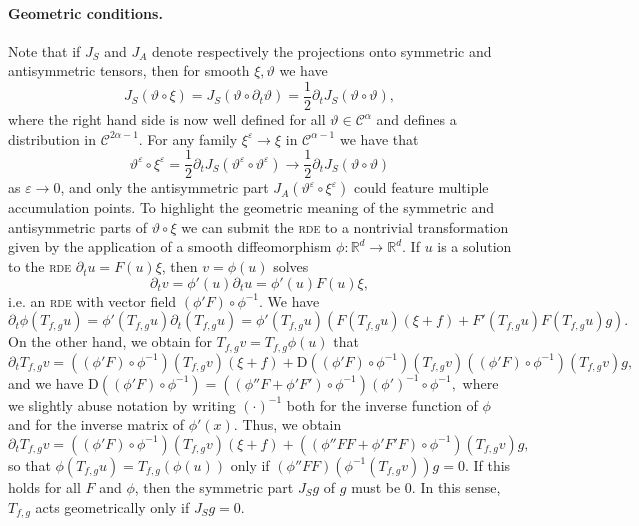 \documentclass[11pt,a4paper]{article}
\newcommand{\cdummy}{\cdot}
\newcommand{\mathD}{\mathrm{D}}
\theoremstyle{remark}
\newcommand{\CC}{\ensuremath{\mathscr{C}}}
\begin{document}
\paragraph{Geometric conditions.}
Note that if $J_{S}$ and $J_{A}$ denote respectively the projections onto
symmetric and antisymmetric tensors, then for smooth $\xi , \vartheta$ we have
\[
   J_{S} ( \vartheta \circ \xi ) = J_{S} ( \vartheta \circ \partial_{t}  \vartheta ) = \frac{1}{2} \partial_{t} J_{S} ( \vartheta \circ  \vartheta ),
\]
where the right hand side is now well defined for all $\vartheta \in \CC^{\alpha}$ and defines a distribution in $\CC^{2 \alpha -1}$. For any
family $\xi^\varepsilon \rightarrow \xi$ in $\CC^{\alpha -1}$ we have that
\[
   \vartheta^\varepsilon \circ \xi^\varepsilon = \frac{1}{2} \partial_{t} J_{S} (\vartheta^\varepsilon \circ   \vartheta^\varepsilon ) \rightarrow \frac{1}{2} \partial_{t} J_{S} ( \vartheta \circ   \vartheta )
\]
as $\varepsilon \rightarrow 0$, and only the antisymmetric part $J_{A} (\vartheta^\varepsilon \circ   \xi^\varepsilon )$ could feature multiple accumulation points.
To highlight the geometric meaning of the symmetric and antisymmetric parts of $\vartheta \circ \xi$ we can submit the \textsc{rde} to a  nontrivial transformation given by the application of a smooth
diffeomorphism $\phi \colon\mathbb{R}^{d} \rightarrow \mathbb{R}^{d}$. If $u$ is
a solution to the \textsc{rde} $\partial_{t} u=F ( u ) \xi$, then $v= \phi ( u )$
solves
\[
   \partial_{t} v= \phi' ( u ) \partial_{t} u= \phi' ( u ) F ( u ) \xi,
\]
i.e. an \textsc{rde} with vector field $( \phi' F ) \circ \phi^{-1}$. We have
\[
   \partial_{t} \phi ( T_{f,g} u ) = \phi' ( T_{f,g} u ) \partial_{t} (T_{f,g} u ) = \phi' ( T_{f,g} u ) ( F ( T_{f,g} u ) ( \xi +f ) +F' (T_{f,g} u ) F ( T_{f,g} u ) g ).
\]
On the other hand, we obtain for $T_{f,g} v=T_{f,g} \phi ( u )$ that
\[
   \partial_{t} T_{f,g} v= ( ( \phi' F ) \circ \phi^{-1} ) ( T_{f,g} v ) ( \xi+f ) + \mathD ( ( \phi' F ) \circ \phi^{-1} ) ( T_{f,g} v ) ( ( \phi' F ) \circ \phi^{-1} ) ( T_{f,g} v ) g,
\]
and we have
$
   \mathD ( ( \phi' F ) \circ \phi^{-1} ) = ( ( \phi'' F+ \phi' F' ) \circ \phi^{-1} ) ( \phi' )^{-1} \circ \phi^{-1} ,
$
where we slightly abuse notation by writing $( \cdummy )^{-1}$ both for the
inverse function of $\phi$ and for the inverse matrix of $\phi' ( x )$. Thus,
we obtain
\[
   \partial_{t} T_{f,g} v= ( ( \phi' F ) \circ \phi^{-1} ) ( T_{f,g} v ) ( \xi +f ) + ( ( \phi'' FF+ \phi' F' F ) \circ \phi^{-1} ) ( T_{f,g} v ) g,
\]
so that
$
   \phi ( T_{f,g} u ) =T_{f,g} ( \phi ( u ) )
$
only if
$
   ( \phi'' FF ) ( \phi^{-1} ( T_{f,g} v ) ) g=0.
$
If this holds for all $F$ and $\phi$, then the symmetric part $J_{S} g$ of
$g$ must be 0. In this sense, $T_{f,g}$ acts geometrically only if $J_S g=0$.
\end{document}
